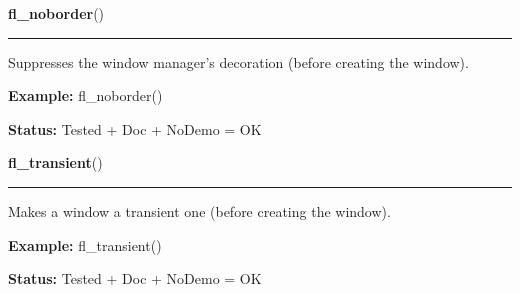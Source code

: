     \label{xformslib:flxbasic:fl_noborder}

    \vspace{0.5ex}

\hspace{.8\funcindent}\begin{boxedminipage}{\funcwidth}

    \raggedright \textbf{fl\_noborder}()

    \vspace{-1.5ex}

    \rule{\textwidth}{0.5\fboxrule}
\setlength{\parskip}{2ex}
    Suppresses the window manager's decoration (before creating the 
    window).

\setlength{\parskip}{1ex}
\textbf{Example:} fl\_noborder()



\textbf{Status:} Tested + Doc + NoDemo = OK



    \end{boxedminipage}

    \label{xformslib:flxbasic:fl_transient}

    \vspace{0.5ex}

\hspace{.8\funcindent}\begin{boxedminipage}{\funcwidth}

    \raggedright \textbf{fl\_transient}()

    \vspace{-1.5ex}

    \rule{\textwidth}{0.5\fboxrule}
\setlength{\parskip}{2ex}
    Makes a window a transient one (before creating the window).

\setlength{\parskip}{1ex}
\textbf{Example:} fl\_transient()



\textbf{Status:} Tested + Doc + NoDemo = OK



    \end{boxedminipage}

    \label{xformslib:flxbasic:fl_get_winsize}

